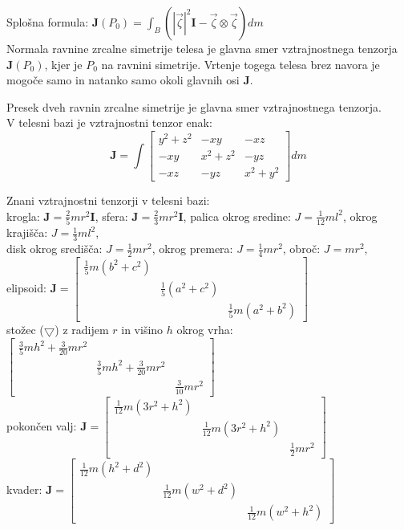\documentclass[a4paper,10pt]{article}
\theoremstyle{definition}
\begin{document}
 Splošna formula: $\mathbf{J}(P_0) = \int_B
(|\vec{\zeta}|^2 \mathbf I - \vec{\zeta} \otimes \vec{\zeta} ) dm$\\

Normala ravnine zrcalne simetrije telesa je glavna smer vztrajnostnega tenzorja
$\mathbf{J}(P_0)$, kjer je $P_0$ na ravnini simetrije. Vrtenje togega telesa brez navora je mogoče samo in natanko samo okoli glavnih osi $\mathbf J.$

Presek dveh ravnin zrcalne simetrije je glavna smer vztrajnostnega tenzorja.\\

V telesni bazi je vztrajnostni tenzor enak:
\[ \mathbf{J} = \int
  \begin{bmatrix}
    y^2 + z^2 & -xy & -xz \\
    -xy & x^2 + z^2 & -yz \\
    -xz & -yz & x^2 + y^2
\end{bmatrix} dm \]

Znani vztrajnostni tenzorji v telesni bazi: \\
krogla: $\mathbf{J} = \frac25mr^2\mathbf I$, sfera: $\mathbf{J} = \frac23mr^2\mathbf I$, palica okrog sredine:
$J = \frac{1}{12}ml^2$, okrog krajišča: $J = \frac{1}{3}ml^2$, \\disk okrog
središča: $J = \frac12mr^2$, okrog premera: $J = \frac14mr^2$, obroč: $J = mr^2$, \\
elipsoid: $\mathbf{J} =
\begin{bmatrix}
  \frac15m(b^2+c^2) & & \\ & \frac15(a^2+c^2) & \\ & & \frac15m(a^2+b^2)
\end{bmatrix}$ \\
stožec ($\bigtriangledown$) z radijem $r$ in višino $h$ okrog vrha:
$\begin{bmatrix}
  \frac35 mh^2+\frac{3}{20}mr^2 & & \\ & \frac35mh^2 + \frac{3}{20}mr^2 & \\
  & & \frac{3}{10}mr^2
\end{bmatrix}$ \\
pokončen valj:
$\mathbf{J} = \begin{bmatrix}
  \frac{1}{12}m(3r^2+h^2) & & \\ & \frac{1}{12}m(3r^2 + h^2) & \\ & &
  \frac12 mr^2
\end{bmatrix}$ \\
kvader:
$\mathbf{J} = \begin{bmatrix}
  \frac{1}{12}m(h^2+d^2) &  &  \\  & \frac{1}{12}m(w^2+d^2) &  \\  &  &
  \frac{1}{12}m(w^2 + h^2)
\end{bmatrix}$
\end{document}
